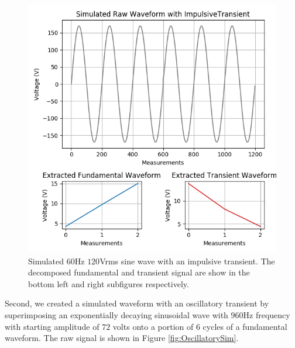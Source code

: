 \documentclass[10pt, conference, compsocconf]{IEEEtran}
\begin{document}
\begin{figure}[ht]
\centering%
\includegraphics[scale=0.35]{./figures/impulsive_sim.png}
\caption{Simulated $60$Hz $120$Vrms sine wave with an impulsive transient. The decomposed fundamental and transient signal are show in the bottom left and right subfigures respectively.}\label{fig:ImpulsiveSim}
\end{figure}

Second, we created a simulated waveform with an oscillatory transient by superimposing an exponentially decaying sinusoidal wave with $960$Hz frequency with starting amplitude of $72$ volts onto a portion of $6$ cycles of a fundamental waveform. The raw signal is shown in Figure \ref{fig:OscillatorySim}.
\end{document}
